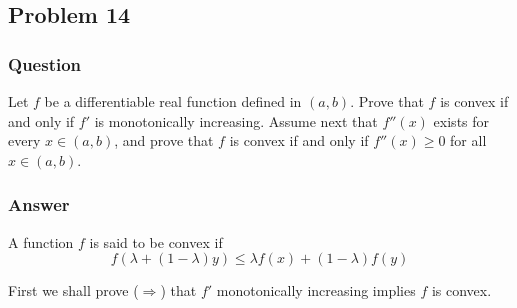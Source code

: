 \documentclass[12pt]{article}
\begin{document}
\subsection{Problem 14}

\subsubsection{Question}
Let $f$ be a differentiable real function defined in $(a, b)$. Prove that $f$ is convex if and only if $f'$ is monotonically increasing. Assume next that $f''(x)$ exists for every $x \in (a,b)$, and prove that $f$ is convex if and only if $f''(x) \geq 0$ for all $x \in (a,b)$.

\subsubsection{Answer}

A function $f$ is said to be convex if
\[f(\lambda  + (1- \lambda) y ) \leq \lambda f(x) + (1-\lambda) f(y) \]

First we shall prove ($\Rightarrow$) that $f'$ monotonically increasing implies $f$ is convex.
\end{document}
